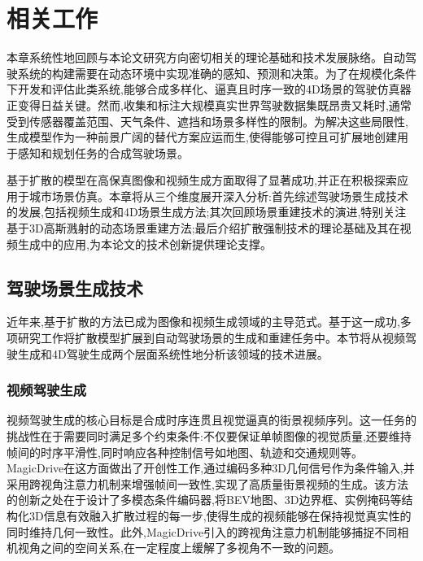 
\chapter{相关工作}

本章系统性地回顾与本论文研究方向密切相关的理论基础和技术发展脉络。自动驾驶系统的构建需要在动态环境中实现准确的感知、预测和决策\cite{chen2024autonomous,hu2023planning,ma2024vision,kong2025multimodal}。为了在规模化条件下开发和评估此类系统,能够合成多样化、逼真且时序一致的4D场景的驾驶仿真器正变得日益关键。然而,收集和标注大规模真实世界驾驶数据集既昂贵又耗时,通常受到传感器覆盖范围、天气条件、遮挡和场景多样性的限制。为解决这些局限性,生成模型作为一种前景广阔的替代方案应运而生,使得能够可控且可扩展地创建用于感知和规划任务的合成驾驶场景。

基于扩散的模型在高保真图像和视频生成方面取得了显著成功,并正在积极探索应用于城市场景仿真。本章将从三个维度展开深入分析:首先综述驾驶场景生成技术的发展,包括视频生成和4D场景生成方法;其次回顾场景重建技术的演进,特别关注基于3D高斯溅射的动态场景重建方法;最后介绍扩散强制技术的理论基础及其在视频生成中的应用,为本论文的技术创新提供理论支撑。

\section{驾驶场景生成技术}

近年来,基于扩散的方法\cite{ho2020denoising,ddpm2015,song2020score}已成为图像和视频生成领域的主导范式。基于这一成功,多项研究工作\cite{gao2024magicdrive,wen2024panacea,mao2025dreamdrive,wang2024drivedreamer,wang2024stag1,wen2024panacea,li2024hierarchical,gao2025vista,li2023bridging,wang2024driving}将扩散模型扩展到自动驾驶场景的生成和重建任务中。本节将从视频驾驶生成和4D驾驶生成两个层面系统性地分析该领域的技术进展。

\subsection{视频驾驶生成}

视频驾驶生成的核心目标是合成时序连贯且视觉逼真的街景视频序列。这一任务的挑战性在于需要同时满足多个约束条件:不仅要保证单帧图像的视觉质量,还要维持帧间的时序平滑性,同时响应各种控制信号如地图、轨迹和交通规则等。MagicDrive\cite{gao2024magicdrive}在这方面做出了开创性工作,通过编码多种3D几何信号作为条件输入,并采用跨视角注意力机制来增强帧间一致性,实现了高质量街景视频的生成。该方法的创新之处在于设计了多模态条件编码器,将BEV地图、3D边界框、实例掩码等结构化3D信息有效融入扩散过程的每一步,使得生成的视频能够在保持视觉真实性的同时维持几何一致性。此外,MagicDrive引入的跨视角注意力机制能够捕捉不同相机视角之间的空间关系,在一定程度上缓解了多视角不一致的问题。

